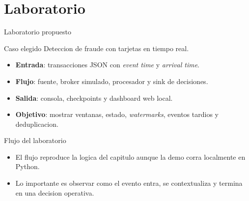 \documentclass[aspectratio=169]{beamer}
\begin{document}
\section{Laboratorio}

\begin{frame}{Laboratorio propuesto}
  \begin{block}{Caso elegido}
    Deteccion de fraude con tarjetas en tiempo real.
  \end{block}
  \begin{itemize}
    \item \textbf{Entrada}: transacciones JSON con \textit{event time} y \textit{arrival time}.
    \item \textbf{Flujo}: fuente, broker simulado, procesador y sink de decisiones.
    \item \textbf{Salida}: consola, checkpoints y dashboard web local.
    \item \textbf{Objetivo}: mostrar ventanas, estado, \textit{watermarks}, eventos tardios y deduplicacion.
  \end{itemize}
\end{frame}

\begin{frame}{Flujo del laboratorio}
  \centering
  \vspace{0.25cm}

  \begin{itemize}
    \item El flujo reproduce la logica del capitulo aunque la demo corra localmente en Python.
    \item Lo importante es observar como el evento entra, se contextualiza y termina en una decision operativa.
  \end{itemize}
\end{frame}
\end{document}
